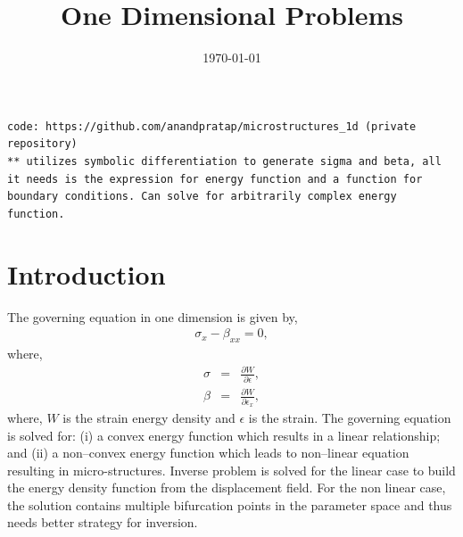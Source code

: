 \documentclass[%
notitlepage,
]{revtex4-1}
\begin{document}
\preprint{}

\title[]{One Dimensional Problems}%


\date{\today}%

\begin{abstract}

\end{abstract}

\maketitle
\tableofcontents
\vspace{1cm}
\texttt{code: https://github.com/anandpratap/microstructures\_1d (private repository)\\
** utilizes symbolic differentiation to generate sigma and beta, all it needs is the expression for energy function and a function for boundary conditions. Can solve for arbitrarily complex energy function.}
\section{Introduction}
The governing equation in one dimension is given by,
\begin{eqnarray}
  \sigma_x - \beta_{xx} = 0,\label{eq:main}
\end{eqnarray} 
where,
\begin{eqnarray}
  \sigma &=& \frac{\partial W }{ \partial \epsilon},\\
  \beta &=& \frac{\partial W}{\partial \epsilon_x},
\end{eqnarray}
where, $W$ is the strain energy density and $\epsilon$ is the strain. The governing equation is solved for: (i) a convex energy function which results in a linear relationship; and (ii) a non--convex energy function which leads to non--linear equation resulting in micro-structures. Inverse problem is solved for the linear case to build the energy density function from the displacement field. For the non linear case, the solution contains multiple bifurcation points in the parameter space and thus needs better strategy for inversion. 
\end{document}
